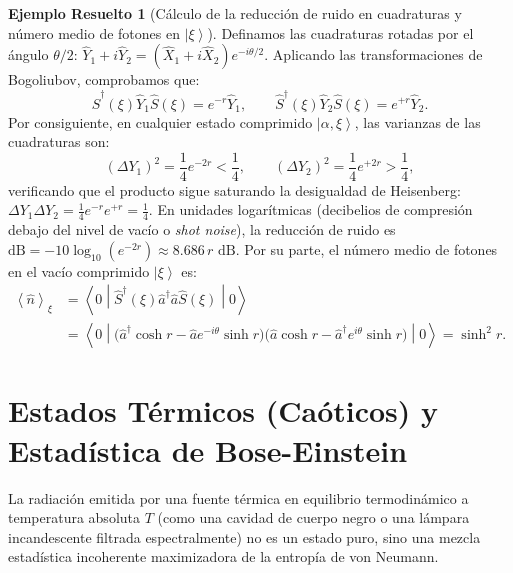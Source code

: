 \documentclass[11pt,a4paper,twoside]{report}
\theoremstyle{definition}
\newtheorem{ejemplo}{Ejemplo Resuelto}[chapter]
\theoremstyle{plain}
\theoremstyle{remark}
\newcommand{\ket}[1]{\left| #1 \right\rangle}
\newcommand{\mel}[3]{\left\langle #1 \middle| #2 \middle| #3 \right\rangle}
\newcommand{\expval}[1]{\left\langle #1 \right\rangle}
\newcommand{\op}[1]{\hat{#1}}
\begin{document}
\begin{ejemplo}[Cálculo de la reducción de ruido en cuadraturas y número medio de fotones en $\ket{\xi}$]
Definamos las cuadraturas rotadas por el ángulo $\theta/2$: $\op{Y}_1 + i\op{Y}_2 = (\op{X}_1 + i\op{X}_2)e^{-i\theta/2}$. Aplicando las transformaciones de Bogoliubov, comprobamos que:
\begin{equation}
    \op{S}^\dagger(\xi)\op{Y}_1\op{S}(\xi) = e^{-r}\op{Y}_1, \qquad \op{S}^\dagger(\xi)\op{Y}_2\op{S}(\xi) = e^{+r}\op{Y}_2.
\end{equation}
Por consiguiente, en cualquier estado comprimido $\ket{\alpha, \xi}$, las varianzas de las cuadraturas son:
\begin{equation}
    (\Delta Y_1)^2 = \frac{1}{4}e^{-2r} < \frac{1}{4}, \qquad (\Delta Y_2)^2 = \frac{1}{4}e^{+2r} > \frac{1}{4},
\end{equation}
verificando que el producto sigue saturando la desigualdad de Heisenberg: $\Delta Y_1 \Delta Y_2 = \frac{1}{4}e^{-r}e^{+r} = \frac{1}{4}$. En unidades logarítmicas (decibelios de compresión debajo del nivel de vacío o \textit{shot noise}), la reducción de ruido es $\text{dB} = -10\log_{10}(e^{-2r}) \approx 8.686\,r\text{ dB}$. Por su parte, el número medio de fotones en el vacío comprimido $\ket{\xi}$ es:
\begin{align}
    \expval{\op{n}}_\xi &= \mel{0}{\op{S}^\dagger(\xi)\op{a}^\dagger\op{a}\op{S}(\xi)}{0} \nonumber \\
    &= \mel{0}{\big(\op{a}^\dagger\cosh r - \op{a}e^{-i\theta}\sinh r\big)\big(\op{a}\cosh r - \op{a}^\dagger e^{i\theta}\sinh r\big)}{0} = \sinh^2 r.
\end{align}
\end{ejemplo}

\section{Estados Térmicos (Caóticos) y Estadística de Bose-Einstein}

La radiación emitida por una fuente térmica en equilibrio termodinámico a temperatura absoluta $T$ (como una cavidad de cuerpo negro o una lámpara incandescente filtrada espectralmente) no es un estado puro, sino una mezcla estadística incoherente maximizadora de la entropía de von Neumann.
\end{document}
